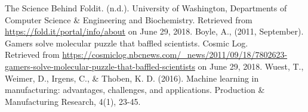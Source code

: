 \documentclass[conference]{IEEEtran}
\begin{document}
\begin{thebibliography}{1}
    The Science Behind Foldit. (n.d.). University of Washington, Departments of Computer Science \& Engineering and Biochemistry. Retrieved from \url{https://fold.it/portal/info/about} on June 29, 2018. 
    Boyle, A., (2011, September). Gamers solve molecular puzzle that baffled scientists. Cosmic Log.\\
    Retrieved from \url{https://cosmiclog.nbcnews.com/_news/2011/09/18/7802623-gamers-solve-molecular-puzzle-that-baffled-scientists} on June 29, 2018.
    Wuest, T., Weimer, D., Irgens, C., \& Thoben, K. D. (2016). Machine learning in manufacturing: advantages, challenges, and applications. Production \& Manufacturing Research, 4(1), 23-45.
\end{thebibliography}
\end{document}
